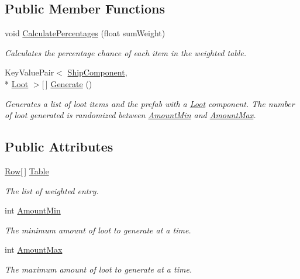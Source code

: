 \subsection*{Public Member Functions}
\begin{DoxyCompactItemize}
\item 
void \hyperlink{class_skyrates_1_1_client_1_1_loot_1_1_loot_table_aa7489e9d16bf34c00b173e475a1cb9a7}{Calculate\-Percentages} (float sum\-Weight)
\begin{DoxyCompactList}\small\item\em Calculates the percentage chance of each item in the weighted table. \end{DoxyCompactList}\item 
Key\-Value\-Pair$<$ \hyperlink{class_skyrates_1_1_client_1_1_ship_1_1_ship_component}{Ship\-Component}, \\*
\hyperlink{class_skyrates_1_1_client_1_1_loot_1_1_loot}{Loot} $>$\mbox{[}$\,$\mbox{]} \hyperlink{class_skyrates_1_1_client_1_1_loot_1_1_loot_table_a3f24f6d81f26862a5aed2b0a14f7e035}{Generate} ()
\begin{DoxyCompactList}\small\item\em Generates a list of loot items and the prefab with a \hyperlink{class_skyrates_1_1_client_1_1_loot_1_1_loot}{Loot} component. The number of loot generated is randomized between \hyperlink{class_skyrates_1_1_client_1_1_loot_1_1_loot_table_ab20cb118131a30a72bd812c4362b4b1b}{Amount\-Min} and \hyperlink{class_skyrates_1_1_client_1_1_loot_1_1_loot_table_a03d5cd741cb0ebf92a7eceb54904e87d}{Amount\-Max}. \end{DoxyCompactList}\end{DoxyCompactItemize}
\subsection*{Public Attributes}
\begin{DoxyCompactItemize}
\item 
\hyperlink{class_skyrates_1_1_client_1_1_loot_1_1_loot_table_1_1_row}{Row}\mbox{[}$\,$\mbox{]} \hyperlink{class_skyrates_1_1_client_1_1_loot_1_1_loot_table_a51353bf82a01b769b9b0174a22e008c0}{Table}
\begin{DoxyCompactList}\small\item\em The list of weighted entry. \end{DoxyCompactList}\item 
int \hyperlink{class_skyrates_1_1_client_1_1_loot_1_1_loot_table_ab20cb118131a30a72bd812c4362b4b1b}{Amount\-Min}
\begin{DoxyCompactList}\small\item\em The minimum amount of loot to generate at a time. \end{DoxyCompactList}\item 
int \hyperlink{class_skyrates_1_1_client_1_1_loot_1_1_loot_table_a03d5cd741cb0ebf92a7eceb54904e87d}{Amount\-Max}
\begin{DoxyCompactList}\small\item\em The maximum amount of loot to generate at a time. \end{DoxyCompactList}\end{DoxyCompactItemize}


